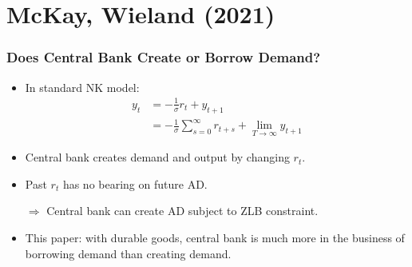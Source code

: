 \documentclass[english,xcolor=svgnames]{beamer}
\begin{document}
\section{McKay, Wieland (2021)}

\begin{frame}
    \frametitle{Does Central Bank Create or Borrow Demand?}
    \begin{itemize}
    	\item In standard NK model:
    	\begin{align*}
    		y_t  &= -\frac{1}{\sigma}r_t +  y_{t+1} \\
    		&= -\frac{1}{\sigma}\sum_{s=0}^{\infty}r_{t+s} + \lim_{T \rightarrow \infty} y_{t+1} 
    	\end{align*}
    	\item Central bank creates demand and output by changing $r_t$.
    	\item Past $r_t$ has no bearing on future AD.
    	\item[$\Rightarrow$] Central bank can create AD subject to ZLB constraint.
    	\item This paper: with durable goods, central bank is much more in the business of borrowing demand than creating demand.
    \end{itemize}
\end{frame}
\end{document}
